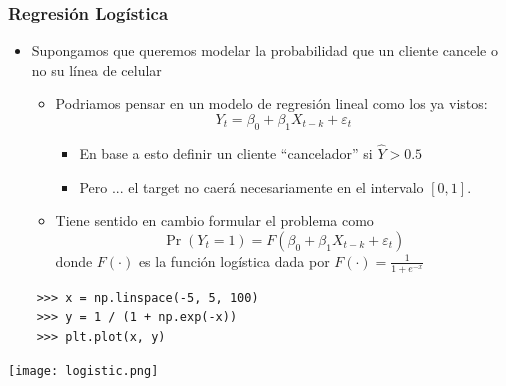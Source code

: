\documentclass[leqno, 10pt, envcountsect]{beamer}
\numberwithin{equation}{section}
\theoremstyle{definition}
\theoremstyle{example}
\numberwithin{figure}{section}
\numberwithin{table}{section}
\let\olditem\item
\renewcommand{\item}{%
\olditem\vspace{1pt}}
\begin{document}
\begin{frame}[fragile=singleslide]
  \frametitle{Regresión Logística}
  \begin{itemize}
    \item Supongamos que queremos modelar la probabilidad que un cliente cancele
      o no su línea de celular
    \begin{itemize}
      \item Podriamos pensar en un modelo de regresión lineal como los ya
        vistos:
        \begin{equation*}
          Y_{t} = \beta_{0} + \beta_{1}X_{t-k} + \varepsilon_{t}
        \end{equation*}
        \begin{itemize}
          \item En base a esto definir un cliente \enquote{cancelador} si $\hat{Y} > 0.5$
          \item Pero ... el target no caerá necesariamente en el intervalo $[0,1]$.
        \end{itemize}
      \item Tiene sentido en cambio formular el problema como
      \begin{equation*}
        \Pr(Y_{t} = 1) = F(\beta_{0} + \beta_{1}X_{t-k} + \varepsilon_{t})
      \end{equation*}
      donde $F(\cdot)$ es la función logística dada por $F(\cdot) = \frac{1}{1 + e^{-x}}$
    \end{itemize}
  \end{itemize}
    \begin{verbatim}
    >>> x = np.linspace(-5, 5, 100)
    >>> y = 1 / (1 + np.exp(-x))
    >>> plt.plot(x, y)
    \end{verbatim}
    \begin{center}
      \texttt{[image: logistic.png]}
    \end{center}
\end{frame}
\end{document}
